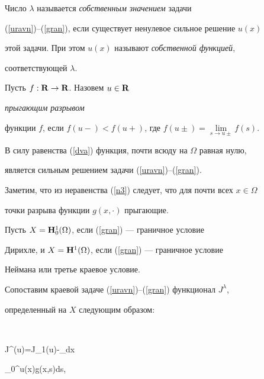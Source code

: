 \begin{defns}


Число $\lambda$ называется {\it собственным значением} задачи


(\ref{uravn})--(\ref{gran}), если существует ненулевое сильное решение $u(x)$


этой задачи. При этом $u(x)$ называют {\it собственной функцией},


соответствующей $\lambda$.


\end{defns}





\begin{defns}


Пусть $f:{\bold R} \to {\bold R}$. Назовем $u \in{\bold R}$


{\it прыгающим разрывом}


функции $f$, если $f(u-)<f(u+)$, где $f(u \pm)=\lim \limits_{s \to u \pm} f(s)$.


\end{defns}





В силу равенства (\ref{dva}) функция, почти всюду на $\Omega$ равная нулю,


является сильным решением задачи (\ref{uravn})--(\ref{gran}).





Заметим, что из неравенства (\ref{n3}) следует, что для почти всех $x\in\Omega$


точки разрыва функции $g(x, \cdot)$ прыгающие.





Пусть $X={\bold H}^1_0(\Omega)$, если (\ref{gran}) --- граничное условие


Дирихле, и $X={\bold H}^1(\Omega)$, если (\ref{gran}) --- граничное условие


Неймана или третье краевое условие.





Сопоставим краевой задаче (\ref{uravn})--(\ref{gran}) функционал $J^\lambda$,


определенный на $X$ следующим образом:


$$


J^{\lambda}(u)=J_1(u)-\lambda\int_{\Omega}dx


\int_0^{u(x)}g(x,s)ds,


